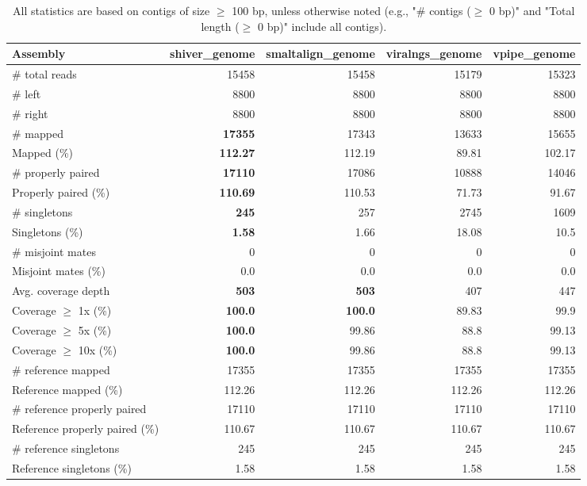\documentclass[12pt,a4paper]{article}
\begin{document}
\begin{table}[ht]
\begin{center}
\caption{All statistics are based on contigs of size $\geq$ 100 bp, unless otherwise noted (e.g., "\# contigs ($\geq$ 0 bp)" and "Total length ($\geq$ 0 bp)" include all contigs).}
\begin{tabular}{|l*{4}{|r}|}
\hline
Assembly & shiver\_genome & smaltalign\_genome & viralngs\_genome & vpipe\_genome \\ \hline
\# total reads & 15458 & 15458 & 15179 & 15323 \\ \hline
\# left & 8800 & 8800 & 8800 & 8800 \\ \hline
\# right & 8800 & 8800 & 8800 & 8800 \\ \hline
\# mapped & {\bf 17355} & 17343 & 13633 & 15655 \\ \hline
Mapped (\%) & {\bf 112.27} & 112.19 & 89.81 & 102.17 \\ \hline
\# properly paired & {\bf 17110} & 17086 & 10888 & 14046 \\ \hline
Properly paired (\%) & {\bf 110.69} & 110.53 & 71.73 & 91.67 \\ \hline
\# singletons & {\bf 245} & 257 & 2745 & 1609 \\ \hline
Singletons (\%) & {\bf 1.58} & 1.66 & 18.08 & 10.5 \\ \hline
\# misjoint mates & 0 & 0 & 0 & 0 \\ \hline
Misjoint mates (\%) & 0.0 & 0.0 & 0.0 & 0.0 \\ \hline
Avg. coverage depth & {\bf 503} & {\bf 503} & 407 & 447 \\ \hline
Coverage $\geq$ 1x (\%) & {\bf 100.0} & {\bf 100.0} & 89.83 & 99.9 \\ \hline
Coverage $\geq$ 5x (\%) & {\bf 100.0} & 99.86 & 88.8 & 99.13 \\ \hline
Coverage $\geq$ 10x (\%) & {\bf 100.0} & 99.86 & 88.8 & 99.13 \\ \hline
\# reference mapped & 17355 & 17355 & 17355 & 17355 \\ \hline
Reference mapped (\%) & 112.26 & 112.26 & 112.26 & 112.26 \\ \hline
\# reference properly paired & 17110 & 17110 & 17110 & 17110 \\ \hline
Reference properly paired (\%) & 110.67 & 110.67 & 110.67 & 110.67 \\ \hline
\# reference singletons & 245 & 245 & 245 & 245 \\ \hline
Reference singletons (\%) & 1.58 & 1.58 & 1.58 & 1.58 \\ \hline

\end{tabular}
\end{center}
\end{table}
\end{document}
